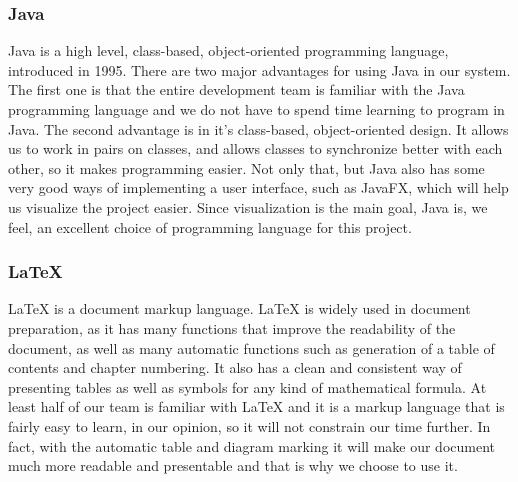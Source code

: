 \documentclass[../document.tex]{subfiles}
\begin{document}
\subsubsection*{Java}
Java is a high level, class-based, object-oriented programming language, introduced in 1995. There are two major advantages for using Java in our system. The first one is that the entire development team is familiar with the Java programming language and we do not have to spend time learning to program in Java. The second advantage is in it’s class-based, object-oriented design. It allows us to work in pairs on classes, and allows classes to synchronize better with each other, so it makes programming easier. Not only that, but Java also has some very good ways of implementing a user interface, such as JavaFX, which will help us visualize the project easier. Since visualization is the main goal, Java is, we feel, an excellent choice of programming language for this project.

\subsubsection*{LaTeX}
LaTeX is a document markup language. LaTeX is widely used in document preparation, as it has many functions that improve the readability of the document, as well as many automatic functions such as generation of a table of contents and chapter numbering. It also has a clean and consistent way of presenting tables as well as symbols for any kind of mathematical formula. At least half of our team is familiar with LaTeX and it is a markup language that is fairly easy to learn, in our opinion, so it will not constrain our time further. In fact, with the automatic table and diagram marking it will make our document much more readable and presentable and that is why we choose to use it.
\end{document}
